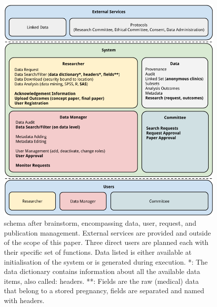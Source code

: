 \begin{figure}[!h]
	\centering
	\includegraphics[width=1.0\linewidth]{images/brainstorm-after}
	\caption{
		\ivfsystem{} schema after brainstorm, encompassing data, user, request, and publication management.
		External services are provided and outside of the scope of this paper.
		Three direct users are planned each with their specific set of functions.
		Data listed is either available at initialisation of the system or is generated during execution.
		*: The data dictionary contains information about all the available data items, also called: headers.
		**: Fields are the raw (medical) data that belong to a stored pregnancy, fields are separated and named with headers.
	}
	\label{fig:brainstorm-after}
\end{figure}